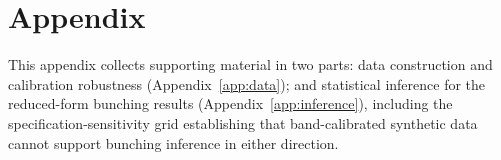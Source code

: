 \section{Appendix}
\label{sec:appendix}

This appendix collects supporting material in two parts: data
construction and calibration robustness (Appendix~\ref{app:data});
and statistical inference for the reduced-form bunching results
(Appendix~\ref{app:inference}), including the specification-sensitivity grid
establishing that band-calibrated synthetic data cannot support
bunching inference in either direction.



